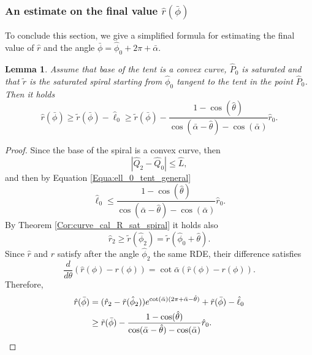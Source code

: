 \documentclass[reqno]{amsart}
\theoremstyle{definition} \newtheorem{definition}{Definition}[section]
\theoremstyle{definition} \newtheorem{remark}[definition]{Remark}
\theoremstyle{plain} \newtheorem{lemma}[definition]{Lemma}
\theoremstyle{plain} \newtheorem{proposition}[definition]{Proposition}
\theoremstyle{plain} \newtheorem{theorem}[definition]{Theorem}
\theoremstyle{plain} \newtheorem{corollary}[definition]{Corollary}
\theoremstyle{definition} \newtheorem{example}[definition]{Example}
\theoremstyle{plain} \newtheorem{claim}[clai]{Claim}
\theoremstyle{definition} \newtheorem{assumption}[definition]{Assumption}
\theoremstyle{definition} \newtheorem{observation}[definition]{Observation}
\newcommand{\1}{\mathbbm 1}
\numberwithin{equation}{section} %
\theoremstyle{plain} \newtheorem*{theorem*}{Theorem}
\theoremstyle{plain} \newtheorem{mthm}[maintheorem]{Main Theorem}
\theoremstyle{plain} \newtheorem*{mthm*}{Main Theorem}
\theoremstyle{plain} \newtheorem*{conjecture*}{Conjecture}
\theoremstyle{plain} \newtheorem{conjecture}[definition]{Conjecture}
\theoremstyle{plain} \newtheorem*{problem*}{Problem}
\begin{document}


\subsubsection{An estimate on the final value $\hat r(\bar \phi)$}
\label{Sss:estima_final_value}


To conclude this section, we give a simplified formula for estimating the final value of $\hat r$ and the angle $\bar \phi = \hat \phi_0 + 2\pi + \bar \alpha$.

\begin{lemma}
\label{Lem:final_value_satu}
Assume that base of the tent is a convex curve, $\hat P_0$ is saturated and that $\tilde r$ is the saturated spiral starting from $\hat \phi_0$ tangent to the tent in the point $\hat P_0$. Then it holds
\begin{equation*}
\hat r(\bar \phi) \geq \tilde r(\bar \phi) - \hat \ell_0 \geq \tilde r(\bar \phi) - \frac{1 - \cos(\hat \theta)}{\cos(\bar \alpha - \hat \theta) - \cos(\bar \alpha)} \hat r_0.
\end{equation*}
\end{lemma}

\begin{proof}
Since the base of the spiral is a convex curve, then
\begin{equation*}
|\hat Q_2 - \hat Q_0| \leq \hat L,
\end{equation*}
and then by Equation \eqref{Equa:ell_0_tent_general}
\begin{equation*}
\hat \ell_0 \leq \frac{1 - \cos(\hat \theta)}{\cos(\bar \alpha - \hat \theta) - \cos(\bar \alpha)} \hat r_0.
\end{equation*}
By Theorem \ref{Cor:curve_cal_R_sat_spiral} it holds also
\begin{equation*}
\hat r_2 \geq \tilde r(\hat \phi_2) = \tilde r(\hat \phi_0 + \hat \theta).
\end{equation*}
Since $\hat r$ and $r$ satisfy after the angle $\hat\phi_2$ the same RDE, their difference satisfies 
\begin{equation*}
	\frac{d}{d\theta}(\hat r(\phi)-r(\phi))=\cot\bar\alpha(\hat r(\phi)-r(\phi)).
	\end{equation*}
Therefore,
\begin{align*}
\hat r(\bar \phi) &= (\hat r_2 - \tilde r(\hat \phi_2)) e^{\cot(\bar \alpha)(2\pi + \bar \alpha - \hat \theta)} + \tilde r(\bar \phi) - \hat \ell_0 \\
&\geq \tilde r(\bar \phi) - \frac{1 - \cos(\hat \theta)}{\cos(\bar \alpha - \hat \theta) - \cos(\bar \alpha)} \hat r_0. \qedhere
\end{align*}
\end{proof}
\end{document}
